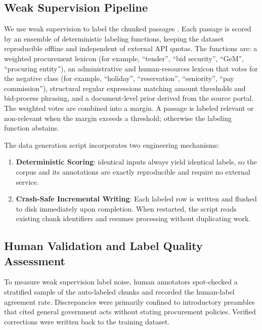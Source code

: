 \documentclass{article}
\begin{document}
\subsection{Weak Supervision Pipeline}
We use weak supervision to label the chunked passages \citep{ratner2017snorkel, mintz2009distant}. Each passage is scored by an ensemble of deterministic labeling functions, keeping the dataset reproducible offline and independent of external API quotas. The functions are: a weighted procurement lexicon (for example, ``tender'', ``bid security'', ``GeM'', ``procuring entity''), an administrative and human-resources lexicon that votes for the negative class (for example, ``holiday'', ``reservation'', ``seniority'', ``pay commission''), structural regular expressions matching amount thresholds and bid-process phrasing, and a document-level prior derived from the source portal. The weighted votes are combined into a margin. A passage is labeled relevant or non-relevant when the margin exceeds a threshold; otherwise the labeling function abstains.

The data generation script incorporates two engineering mechanisms:
\begin{enumerate}
    \item \textbf{Deterministic Scoring}: identical inputs always yield identical labels, so the corpus and its annotations are exactly reproducible and require no external service.
    \item \textbf{Crash-Safe Incremental Writing}: Each labeled row is written and flushed to disk immediately upon completion. When restarted, the script reads existing chunk identifiers and resumes processing without duplicating work.
\end{enumerate}

\subsection{Human Validation and Label Quality Assessment}
To measure weak supervision label noise, human annotators spot-checked a stratified sample of the auto-labeled chunks and recorded the human-label agreement rate. Discrepancies were primarily confined to introductory preambles that cited general government acts without stating procurement policies. Verified corrections were written back to the training dataset.
\end{document}
